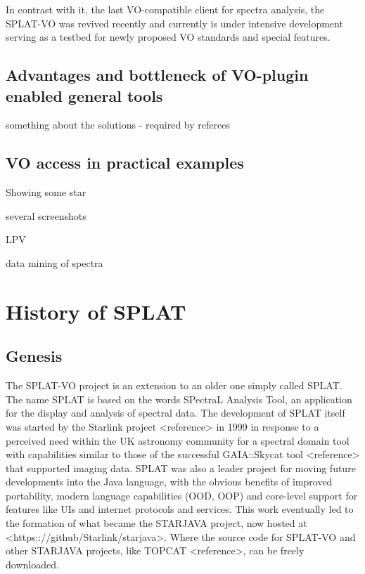 \documentclass[final,authoryear,5p,times,twocolumn]{elsarticle}
\begin{document}
In contrast with it, the last VO-compatible client for spectra analysis, the
SPLAT-VO was revived recently and currently is under intensive development
serving as a testbed for newly proposed VO standards and special features. 

 



\subsection{Advantages and bottleneck of  VO-plugin enabled general tools}


something about the solutions - required by referees





\subsection{VO access in practical examples}


Showing some star 

several screenshots

LPV

data mining of spectra




\section{History of SPLAT}
\subsection{Genesis}

The SPLAT-VO project is an extension to an older one simply called SPLAT. The
name SPLAT is based on the words SPectraL Analysis Tool, an application for
the display and analysis of spectral data. The development of SPLAT itself was
started by the Starlink project <reference> in 1999 in response to a perceived
need within the UK astronomy community for a spectral domain tool with
capabilities similar to those of the successful GAIA::Skycat tool <reference>
that supported imaging data. SPLAT was also a leader project for moving future
developments into the Java language, with the obvious benefits of improved
portability, modern language capabilities (OOD, OOP) and core-level support for
features like UIs and internet protocols and services. This work eventually
led to the formation of what became the STARJAVA project, now hosted at
<https:://github/Starlink/starjava>. Where the source code for SPLAT-VO and
other STARJAVA projects, like TOPCAT <reference>, can be freely downloaded.
\end{document}
